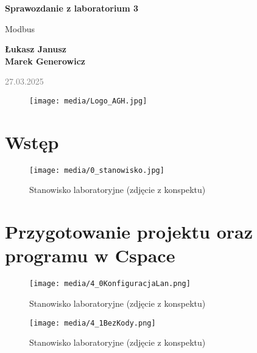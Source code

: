 \documentclass{article}
\begin{document}
\begin{titlepage}
    \begin{center}
        \vspace*{1cm}
            
        \Huge
        \textbf{Sprawozdanie z laboratorium 3}
            
        \vspace{0.5cm}
        \LARGE
        Modbus 
            
        \vspace{1.5cm}
            
        \textbf{Łukasz Janusz\\Marek Generowicz}

        \normalsize      
        \textcolor{gray}{27.03.2025}
        \vfill
        \begin{figure}[hb]
            \centering
            \texttt{[image: media/Logo\_AGH.jpg]}
        \end{figure}   
    \end{center}
\end{titlepage}

\section{Wstęp}

\begin{figure}[H]
    \centering
    \texttt{[image: media/0\_stanowisko.jpg]}
    \caption{Stanowisko laboratoryjne (zdjęcie z konspektu)}
    \label{fig:stanowisko}
\end{figure}


\newpage
\section{Przygotowanie projektu oraz programu w Cspace}

\begin{figure}[H]
    \centering
    \texttt{[image: media/4\_0KonfiguracjaLan.png]}
    \caption{Stanowisko laboratoryjne (zdjęcie z konspektu)}
    \label{fig:zdj1}
\end{figure}


\begin{figure}[H]
    \centering
    \texttt{[image: media/4\_1BezKody.png]}
    \caption{Stanowisko laboratoryjne (zdjęcie z konspektu)}
    \label{fig:zdj2}
\end{figure}
\end{document}
